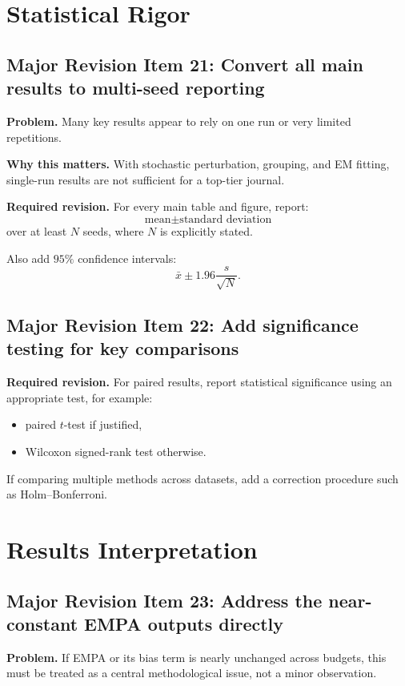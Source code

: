 \section{Statistical Rigor}

\subsection*{Major Revision Item 21: Convert all main results to multi-seed reporting}
\textbf{Problem.} Many key results appear to rely on one run or very limited repetitions.

\textbf{Why this matters.} With stochastic perturbation, grouping, and EM fitting, single-run results are not sufficient for a top-tier journal.

\textbf{Required revision.}
For every main table and figure, report:
\[
\text{mean} \pm \text{standard deviation}
\]
over at least $N$ seeds, where $N$ is explicitly stated.

Also add $95\%$ confidence intervals:
\[
\bar{x} \pm 1.96 \frac{s}{\sqrt{N}}.
\]

\subsection*{Major Revision Item 22: Add significance testing for key comparisons}
\textbf{Required revision.}
For paired results, report statistical significance using an appropriate test, for example:
\begin{itemize}
    \item paired $t$-test if justified,
    \item Wilcoxon signed-rank test otherwise.
\end{itemize}

If comparing multiple methods across datasets, add a correction procedure such as Holm--Bonferroni.

\section{Results Interpretation}

\subsection*{Major Revision Item 23: Address the near-constant EMPA outputs directly}
\textbf{Problem.} If EMPA or its bias term is nearly unchanged across budgets, this must be treated as a central methodological issue, not a minor observation.

